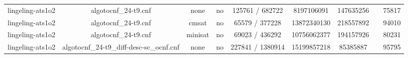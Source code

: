 \begin{appendices}
\begin{table}[p]
\begin{center}
\begin{tabular}{l|cccccccc}
  lingeling-ats1o2               & algotocnf\_24-t9.cnf           & none       & no    & 125761 / 682722 & 8197106091 & 147635256 &            & 75817 \\ %
  lingeling-ats1o2               & algotocnf\_24-t9.cnf           & cmsat      & no    & 65579 / 377228 & 13872340130 & 218557892 &            & 94010 \\ %
  lingeling-ats1o2               & algotocnf\_24-t9.cnf           & minisat    & no    & 69023 / 436292 & 10756062377 & 194157926 &            & 80231 \\ %
  lingeling-ats1o2               & algotocnf\_24-t9\_diff-desc-sc\_ocnf.cnf & none       & no    & 227841 / 1380914 & 15199857218 & 85385887  &            & 95795 \\ %
    \end{tabular}
  \end{center}
\end{table}

\newpage


\end{appendices}
